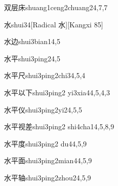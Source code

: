 \begin{verbete}{双层床}{shuang1ceng2chuang2}{4,7,7}
\end{verbete}

\begin{verbete}{水}{shui3}{4}[Radical 水][Kangxi 85]
\end{verbete}

\begin{verbete}{水边}{shui3bian1}{4,5}
\end{verbete}

\begin{verbete}{水平}{shui3ping2}{4,5}
\end{verbete}

\begin{verbete}{水平尺}{shui3ping2chi3}{4,5,4}
\end{verbete}

\begin{verbete}{水平以下}{shui3ping2 yi3xia4}{4,5,4,3}
\end{verbete}

\begin{verbete}{水平仪}{shui3ping2yi2}{4,5,5}
\end{verbete}

\begin{verbete}{水平视差}{shui3ping2 shi4cha1}{4,5,8,9}
\end{verbete}

\begin{verbete}{水平度}{shui3ping2 du4}{4,5,9}
\end{verbete}

\begin{verbete}{水平面}{shui3ping2mian4}{4,5,9}
\end{verbete}

\begin{verbete}{水平轴}{shui3ping2zhou2}{4,5,9}
\end{verbete}

